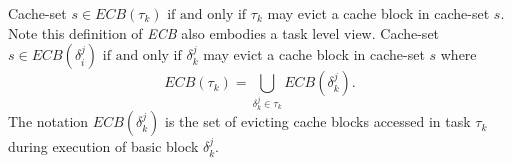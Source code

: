 \noindent Cache-set \begin{math}s \in \textit{ECB}(\tau_{k})\textrm{ if and only if }\tau_{k}\end{math} may evict a cache block in cache-set $s$.  Note this definition of \textit{ECB} also embodies a task level view.  Cache-set \begin{math}s \in \textit{ECB}(\delta_{i}^{j})\textrm{ if and only if } \delta_{k}^{j}\end{math} may evict a cache block in cache-set $s$ where
\begin{equation}\label{eqn:ecb-task}
    \textit{ECB}(\tau_{k}) = \bigcup_{\delta_{k}^{j} \in \tau_{k}} \textit{ECB}(\delta_{k}^{j}).
\end{equation}
\noindent The notation \begin{math}\textit{ECB}(\delta_{k}^{j})\end{math} is the set of evicting cache blocks accessed in task \begin{math}\tau_{k}\end{math} during execution of basic block \begin{math}\delta_{k}^{j}\end{math}.


